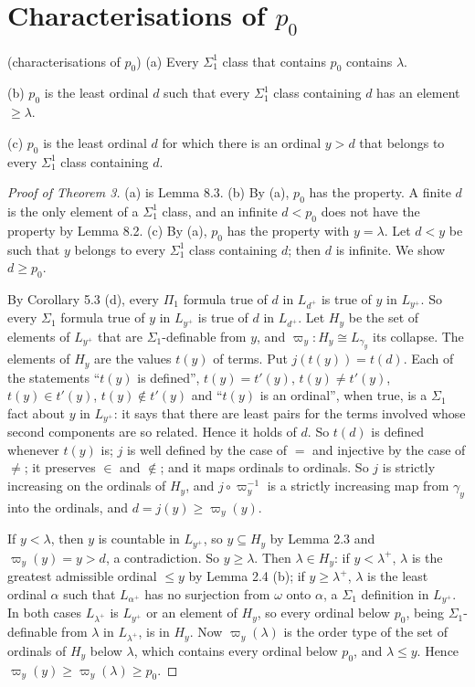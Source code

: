 \documentclass[11pt]{article}
\begin{document}
\section{Characterisations of $p_0$}

\begin{statement} (characterisations of $p_0$) (a) Every $\Sigma^1_1$ class that contains $p_0$
contains $\lambda$.

(b) $p_0$ is the least ordinal $d$ such that every $\Sigma^1_1$ class containing $d$ has an element $\ge \lambda$.

(c) $p_0$ is the least ordinal $d$ for which there is an ordinal $y > d$ that belongs to every $\Sigma^1_1$ class
containing $d$.
\end{statement}

\begin{proof}[Proof of Theorem 3] (a) is Lemma 8.3. (b) By (a), $p_0$ has the property. A finite $d$ is the only
element of a $\Sigma^1_1$ class, and an infinite $d < p_0$ does not have the property by Lemma 8.2. (c) By (a),
$p_0$ has the property with $y = \lambda$. Let $d < y$ be such that $y$ belongs to every $\Sigma^1_1$ class containing
$d$; then $d$ is infinite. We show $d \ge p_0$.

By Corollary 5.3 (d), every $\Pi_1$ formula true of $d$ in $L_{d^+}$ is true of $y$ in $L_{y^+}$. So every
$\Sigma_1$ formula true of $y$ in $L_{y^+}$ is true of $d$ in $L_{d^+}$. Let $H_y$ be the set of elements of
$L_{y^+}$ that are $\Sigma_1$-definable from $y$, and $\varpi_y : H_y \cong L_{\gamma_y}$ its collapse. The elements
of $H_y$ are the values $t(y)$ of terms. Put $j(t(y)) = t(d)$. Each of the statements ``$t(y)$ is
defined'', $t(y) = t'(y)$, $t(y) \ne t'(y)$, $t(y) \in t'(y)$, $t(y) \notin t'(y)$ and ``$t(y)$ is an ordinal'',
when true, is a $\Sigma_1$ fact about $y$ in $L_{y^+}$: it says that there are least pairs for the terms
involved whose second components are so related. Hence it holds of $d$. So $t(d)$ is defined whenever $t(y)$ is;
$j$ is well defined by the case of $=$ and injective by the case of $\ne$; it preserves $\in$ and $\notin$; and it
maps ordinals to ordinals. So $j$ is strictly increasing on the ordinals of $H_y$, and
$j \circ \varpi_y^{-1}$ is a strictly increasing map from $\gamma_y$ into the ordinals, and
$d = j(y) \ge \varpi_y(y)$.

If $y < \lambda$, then $y$ is countable in $L_{y^+}$, so $y \subseteq H_y$ by Lemma 2.3 and $\varpi_y(y) = y > d$, a
contradiction. So $y \ge \lambda$. Then $\lambda \in H_y$: if $y < \lambda^+$, $\lambda$ is the greatest admissible ordinal $\le y$ by Lemma
2.4 (b); if $y \ge \lambda^+$, $\lambda$ is the least ordinal $\alpha$ such that $L_{\alpha^+}$ has no surjection from $\omega$
onto $\alpha$, a $\Sigma_1$ definition in $L_{y^+}$. In both cases $L_{\lambda^+}$ is $L_{y^+}$ or an element of $H_y$, so
every ordinal below $p_0$, being $\Sigma_1$-definable from $\lambda$ in $L_{\lambda^+}$, is in $H_y$. Now $\varpi_y(\lambda)$ is the order type of the set of ordinals of $H_y$ below $\lambda$, which contains every
ordinal below $p_0$, and $\lambda \le y$. Hence $\varpi_y(y) \ge \varpi_y(\lambda) \ge p_0$.
\end{proof}
\end{document}

